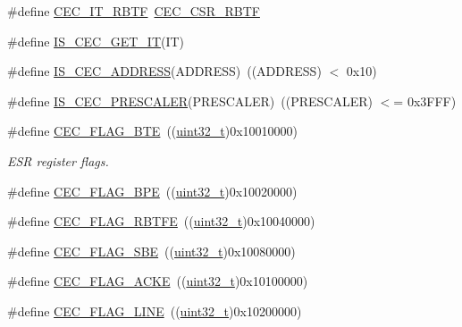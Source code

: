 \begin{DoxyCompactItemize}
\item 
\#define \hyperlink{group___c_e_c__interrupts__definition_ga42834131bf077a878e84470ae98f1bb4}{C\+E\+C\+\_\+\+I\+T\+\_\+\+R\+B\+TF}~\hyperlink{group___peripheral___registers___bits___definition_gaa325807f8f3d4bdf8e989eeef208ca5a}{C\+E\+C\+\_\+\+C\+S\+R\+\_\+\+R\+B\+TF}
\item 
\#define \hyperlink{group___c_e_c__interrupts__definition_ga7f553a4a3346c676101d81a024a9cba8}{I\+S\+\_\+\+C\+E\+C\+\_\+\+G\+E\+T\+\_\+\+IT}(IT)
\item 
\#define \hyperlink{group___c_e_c___own___address_ga0659314b0be6092e73aa373394816557}{I\+S\+\_\+\+C\+E\+C\+\_\+\+A\+D\+D\+R\+E\+SS}(A\+D\+D\+R\+E\+SS)~((A\+D\+D\+R\+E\+SS) $<$ 0x10)
\item 
\#define \hyperlink{group___c_e_c___prescaler_ga88ad62af56298609444942b8f05b6d23}{I\+S\+\_\+\+C\+E\+C\+\_\+\+P\+R\+E\+S\+C\+A\+L\+ER}(P\+R\+E\+S\+C\+A\+L\+ER)~((P\+R\+E\+S\+C\+A\+L\+ER) $<$= 0x3\+F\+F\+F)
\item 
\#define \hyperlink{group___c_e_c__flags__definition_ga66e91438a7df5d00db3c5410d8f7d456}{C\+E\+C\+\_\+\+F\+L\+A\+G\+\_\+\+B\+TE}~((\hyperlink{_p_e___types_8h_a33594304e786b158f3fb30289278f5af}{uint32\+\_\+t})0x10010000)
\begin{DoxyCompactList}\small\item\em E\+SR register flags. \end{DoxyCompactList}\item 
\#define \hyperlink{group___c_e_c__flags__definition_gaf2a5d5dcbc57fc0cf7cfa988533a2a09}{C\+E\+C\+\_\+\+F\+L\+A\+G\+\_\+\+B\+PE}~((\hyperlink{_p_e___types_8h_a33594304e786b158f3fb30289278f5af}{uint32\+\_\+t})0x10020000)
\item 
\#define \hyperlink{group___c_e_c__flags__definition_gafdfca815014dee4a458083337795c336}{C\+E\+C\+\_\+\+F\+L\+A\+G\+\_\+\+R\+B\+T\+FE}~((\hyperlink{_p_e___types_8h_a33594304e786b158f3fb30289278f5af}{uint32\+\_\+t})0x10040000)
\item 
\#define \hyperlink{group___c_e_c__flags__definition_gac77db62c05af2462ed3f1b64cef2e136}{C\+E\+C\+\_\+\+F\+L\+A\+G\+\_\+\+S\+BE}~((\hyperlink{_p_e___types_8h_a33594304e786b158f3fb30289278f5af}{uint32\+\_\+t})0x10080000)
\item 
\#define \hyperlink{group___c_e_c__flags__definition_ga1583b7a221e54f2f19cb121bf310547c}{C\+E\+C\+\_\+\+F\+L\+A\+G\+\_\+\+A\+C\+KE}~((\hyperlink{_p_e___types_8h_a33594304e786b158f3fb30289278f5af}{uint32\+\_\+t})0x10100000)
\item 
\#define \hyperlink{group___c_e_c__flags__definition_gaf751970725df12976dc6c8356910143a}{C\+E\+C\+\_\+\+F\+L\+A\+G\+\_\+\+L\+I\+NE}~((\hyperlink{_p_e___types_8h_a33594304e786b158f3fb30289278f5af}{uint32\+\_\+t})0x10200000)

\end{DoxyCompactItemize}
